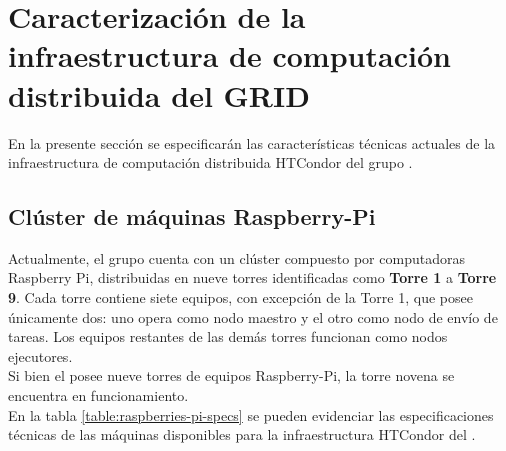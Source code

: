 

\section{Caracterización de la infraestructura de computación distribuida del GRID}
\noindent
En la presente sección se especificarán las características técnicas actuales de la infraestructura de computación distribuida HTCondor del grupo \GRID.


\subsection{Clúster de máquinas Raspberry-Pi}\label{sec:cluster-raspberry}
\noindent

Actualmente, el grupo \GRID cuenta con un clúster compuesto por computadoras Raspberry Pi, distribuidas en nueve torres identificadas como \textbf{Torre 1} a \textbf{Torre 9}. Cada torre contiene siete equipos, con excepción de la Torre 1, que posee únicamente dos: uno opera como nodo maestro y el otro como nodo de envío de tareas. Los equipos restantes de las demás torres funcionan como nodos ejecutores.
\\
Si bien el \GRID posee nueve torres de equipos Raspberry-Pi, la torre novena se encuentra en funcionamiento. \\


En la tabla \ref{table:raspberries-pi-specs} se pueden evidenciar las especificaciones técnicas de las máquinas disponibles para la infraestructura HTCondor del \GRID.
\\


